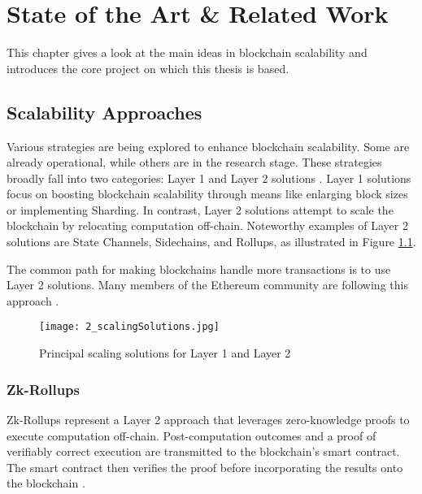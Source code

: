 \chapter{State of the Art \& Related Work}
\label{cha:chapter2}


This chapter gives a look at the main ideas in blockchain scalability and introduces the core project on which this thesis is based.

\section{Scalability Approaches}
Various strategies are being explored to enhance blockchain scalability. Some are already operational, while others are in the research stage. These strategies broadly fall into two categories: Layer 1 and Layer 2 solutions \cite{tyagi_study_2021,thibault_blockchain_2022}. Layer 1 solutions focus on boosting blockchain scalability through means like enlarging block sizes or implementing Sharding. In contrast, Layer 2 solutions attempt to scale the blockchain by relocating computation off-chain. Noteworthy examples of Layer 2 solutions are State Channels, Sidechains, and Rollups, as illustrated in Figure \ref{fig:2_scalingSolutions}.

The common path for making blockchains handle more transactions is to use Layer 2 solutions. Many members of the Ethereum community are following this approach \cite{neiheiser_practical_2023}.

\begin{figure}[ht]
  \centering
  \texttt{[image: 2\_scalingSolutions.jpg]}
  \caption[Scaling Solutions]{Principal scaling solutions for Layer 1 and Layer 2\footnotemark}  
  \label{fig:2_scalingSolutions}
\end{figure} 

\subsection{Zk-Rollups}
\label{sec:2_zkRollups}
Zk-Rollups represent a Layer 2 approach that leverages zero-knowledge proofs to execute computation off-chain. Post-computation outcomes and a proof of verifiably correct execution are transmitted to the blockchain's smart contract. The smart contract then verifies the proof before incorporating the results onto the blockchain \cite{tyagi_study_2021}.

